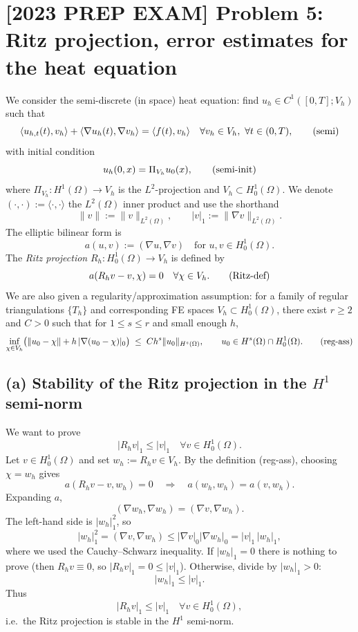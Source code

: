\section*{[2023 PREP EXAM] Problem 5: Ritz projection, error estimates for the heat equation}
We consider the semi-discrete (in space) heat equation: find
\(u_h \in C^1([0,T];V_h)\) such that
\[
    \langle u_{h,t}(t),v_h\rangle + \langle \nabla u_h(t),\nabla v_h\rangle
    = \langle f(t),v_h\rangle \quad \forall v_h\in V_h,\ \forall t\in(0,T), \tag{\text{semi}}
\]
with initial condition
\[
    u_h(0,x) = \Pi_{V_h} u_0(x), \tag{\text{semi-init}}
\]
where \(\Pi_{V_h}:H^1(\Omega)\to V_h\) is the \(L^2\)-projection and
\(V_h\subset H^1_0(\Omega)\).
We denote \((\cdot,\cdot) := \langle\cdot,\cdot\rangle\) the \(L^2(\Omega)\) inner product
and use the shorthand
\[
    \|v\| := \|v\|_{L^2(\Omega)},\qquad |v|_1 := \|\nabla v\|_{L^2(\Omega)}.
\]
The elliptic bilinear form is
\[
    a(u,v) := (\nabla u,\nabla v) \quad \text{for } u,v\in H^1_0(\Omega).
\]
The \emph{Ritz projection} \(R_h:H^1_0(\Omega)\to V_h\) is defined by
\[
    a(R_h v - v,\chi) = 0 \quad \forall \chi\in V_h. \tag{\text{Ritz-def}}
\]
We are also given a regularity/approximation assumption:
for a family of regular triangulations \(\{T_h\}\) and corresponding FE spaces
\(V_h\subset H^1_0(\Omega)\), there exist \(r\ge 2\) and \(C>0\) such that
for \(1\le s\le r\) and small enough \(h\),
\[
    \inf_{\chi\in V_h} \bigl(\|u_0 - \chi\| + h\,|\nabla(u_0 - \chi)|_0\bigr)
    \;\le\; C h^s \|u_0\|_{H^s(\Omega)},
    \qquad u_0\in H^s(\Omega)\cap H^1_0(\Omega). \tag{\text{reg-ass}}
\]
\subsection*{(a) Stability of the Ritz projection in the $H^1$ semi-norm}
We want to prove
\[
    |R_h v|_1 \le |v|_1 \quad \forall v\in H^1_0(\Omega).
\]
Let \(v\in H^1_0(\Omega)\) and set \(w_h := R_h v \in V_h\).
By the definition (reg-ass), choosing \(\chi = w_h\) gives
\[
    a(R_h v - v, w_h) = 0
    \quad\Longrightarrow\quad
    a(w_h,w_h) = a(v,w_h).
\]
Expanding \(a\),
\[
    (\nabla w_h,\nabla w_h) = (\nabla v,\nabla w_h).
\]
The left-hand side is \(|w_h|_1^2\), so
\[
    |w_h|_1^2 = (\nabla v,\nabla w_h)
    \le |\nabla v|_0 |\nabla w_h|_0
    = |v|_1\,|w_h|_1,
\]
where we used the Cauchy--Schwarz inequality.
If \(|w_h|_1 = 0\) there is nothing to prove (then \(R_h v\equiv 0\), so
\(|R_h v|_1 = 0 \le |v|_1\)).
Otherwise, divide by \(|w_h|_1>0\):
\[
    |w_h|_1 \le |v|_1.
\]
Thus
\[
    \boxed{|R_h v|_1 \le |v|_1 \quad \forall v\in H^1_0(\Omega),}
\]
i.e.\ the Ritz projection is stable in the \(H^1\) semi-norm.
